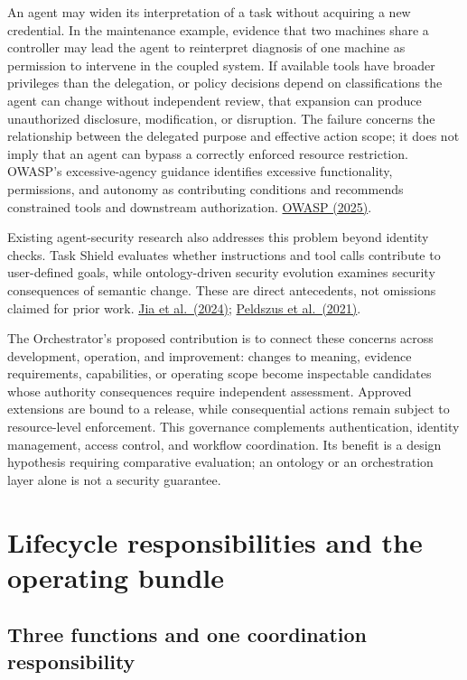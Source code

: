 \documentclass[preprint,12pt,authoryear]{elsarticle}
\begin{document}
An agent may widen its interpretation of a task without acquiring a new
credential. In the maintenance example, evidence that two machines share
a controller may lead the agent to reinterpret diagnosis of one machine
as permission to intervene in the coupled system. If available tools
have broader privileges than the delegation, or policy decisions depend
on classifications the agent can change without independent review, that
expansion can produce unauthorized disclosure, modification, or
disruption. The failure concerns the relationship between the delegated
purpose and effective action scope; it does not imply that an agent can
bypass a correctly enforced resource restriction. OWASP's
excessive-agency guidance identifies excessive functionality,
permissions, and autonomy as contributing conditions and recommends
constrained tools and downstream authorization.
\href{https://genai.owasp.org/llmrisk/llm062025-excessive-agency/}{OWASP
(2025)}.

Existing agent-security research also addresses this problem beyond
identity checks. Task Shield evaluates whether instructions and tool
calls contribute to user-defined goals, while ontology-driven security
evolution examines security consequences of semantic change. These are
direct antecedents, not omissions claimed for prior work.
\href{https://arxiv.org/abs/2412.16682v1}{Jia et al.~(2024)};
\href{https://doi.org/10.1016/j.datak.2021.101907}{Peldszus et
al.~(2021)}.

The Orchestrator's proposed contribution is to connect these concerns
across development, operation, and improvement: changes to meaning,
evidence requirements, capabilities, or operating scope become
inspectable candidates whose authority consequences require independent
assessment. Approved extensions are bound to a release, while
consequential actions remain subject to resource-level enforcement. This
governance complements authentication, identity management, access
control, and workflow coordination. Its benefit is a design hypothesis
requiring comparative evaluation; an ontology or an orchestration layer
alone is not a security guarantee.

\section{Lifecycle responsibilities and the operating
bundle}\label{lifecycle-responsibilities-and-the-operating-bundle}

\subsection{Three functions and one coordination
responsibility}\label{three-functions-and-one-coordination-responsibility}
\end{document}
